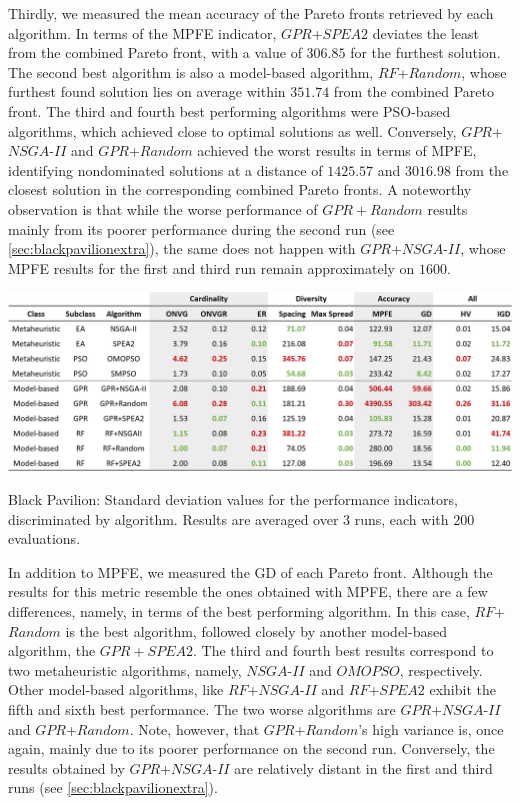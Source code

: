 Thirdly, we measured the mean accuracy of the Pareto fronts retrieved by each algorithm. In terms of the \ac{MPFE} indicator, $GPR$+$SPEA2$ deviates the least from the combined Pareto front, with a value of $306.85$ for the furthest solution. The second best algorithm is also a model-based algorithm, $RF$+$Random$, whose furthest found solution lies on average within $351.74$ from the combined Pareto front. The third and fourth best performing algorithms were \ac{PSO}-based algorithms, which achieved close to optimal solutions as well. Conversely, $GPR$+$NSGA$-$II$ and $GPR$+$Random$ achieved the worst results in terms of \ac{MPFE}, identifying nondominated solutions at a distance of $1425.57$ and $3016.98$ from the closest solution in the corresponding combined Pareto fronts. A noteworthy observation is that while the worse performance of $GPR+Random$ results mainly from its poorer performance during the second run (see \cref{sec:blackpavilionextra}), the same does not happen with $GPR$+$NSGA$-$II$, whose \ac{MPFE} results for the first and third run remain approximately on $1600$. 

\begin{table}[htbp]
	\centering
	\includegraphics[width=\textwidth]{Images/Evaluation/BlackPavilion/Results_Std_20190416.PNG}
	\caption[Black Pavilion: Standard deviations of the performance indicators results, discriminated by each algorithm]{Black Pavilion: Standard deviation values for the performance indicators, discriminated by algorithm. Results are averaged over $3$ runs, each with $200$ evaluations.}
	\label{table:blackpavilionstd}
\end{table}

In addition to \ac{MPFE}, we measured the \ac{GD} of each Pareto front. Although the results for this metric resemble the ones obtained with \ac{MPFE}, there are a few differences, namely, in terms of the best performing algorithm. In this case, $RF$+$Random$ is the best algorithm, followed closely by another model-based algorithm, the $GPR+SPEA2$. The third and fourth best results correspond to two metaheuristic algorithms, namely, $NSGA$-$II$ and $OMOPSO$, respectively. Other model-based algorithms, like $RF$+$NSGA$-$II$ and $RF$+$SPEA2$ exhibit the fifth and sixth best performance. The two worse algorithms are $GPR$+$NSGA$-$II$ and $GPR$+$Random$. Note, however, that $GPR$+$Random$'s high variance is, once again, mainly due to its poorer performance on the second run. Conversely, the results obtained by $GPR$+$NSGA$-$II$ are relatively distant in the first and third runs (see \cref{sec:blackpavilionextra}).

